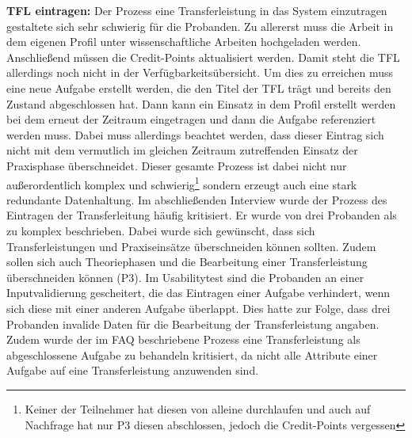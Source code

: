\documentclass[
  12pt,
  ngerman,
  a4paper,
]{article}
\begin{document}
\textbf{TFL eintragen:} Der Prozess eine Transferleistung in das System
einzutragen gestaltete sich sehr schwierig für die Probanden. Zu
allererst muss die Arbeit in dem eigenen Profil unter wissenschaftliche
Arbeiten hochgeladen werden. Anschließend müssen die Credit-Points
aktualisiert werden. Damit steht die TFL allerdings noch nicht in der
Verfügbarkeitsübersicht. Um dies zu erreichen muss eine neue Aufgabe
erstellt werden, die den Titel der TFL trägt und bereits den Zustand
abgeschlossen hat. Dann kann ein Einsatz in dem Profil erstellt werden
bei dem erneut der Zeitraum eingetragen und dann die Aufgabe
referenziert werden muss. Dabei muss allerdings beachtet werden, dass
dieser Eintrag sich nicht mit dem vermutlich im gleichen Zeitraum
zutreffenden Einsatz der Praxisphase überschneidet. Dieser gesamte
Prozess ist dabei nicht nur außerordentlich komplex und
schwierig\footnote{Keiner der Teilnehmer hat diesen von alleine
  durchlaufen und auch auf Nachfrage hat nur P3 diesen abschlossen,
  jedoch die Credit-Points vergessen} sondern erzeugt auch eine stark
redundante Datenhaltung. Im abschließenden Interview wurde der Prozess
des Eintragen der Transferleitung häufig kritisiert. Er wurde von drei
Probanden als zu komplex beschrieben. Dabei wurde sich gewünscht, dass
sich Transferleistungen und Praxiseinsätze überschneiden können sollten.
Zudem sollen sich auch Theoriephasen und die Bearbeitung einer
Transferleistung überschneiden können (P3). Im Usabilitytest sind die
Probanden an einer Inputvalidierung gescheitert, die das Eintragen einer
Aufgabe verhindert, wenn sich diese mit einer anderen Aufgabe überlappt.
Dies hatte zur Folge, dass drei Probanden invalide Daten für die
Bearbeitung der Transferleistung angaben. Zudem wurde der im FAQ
beschriebene Prozess eine Transferleistung als abgeschlossene Aufgabe zu
behandeln kritisiert, da nicht alle Attribute einer Aufgabe auf eine
Transferleistung anzuwenden sind.
\end{document}
